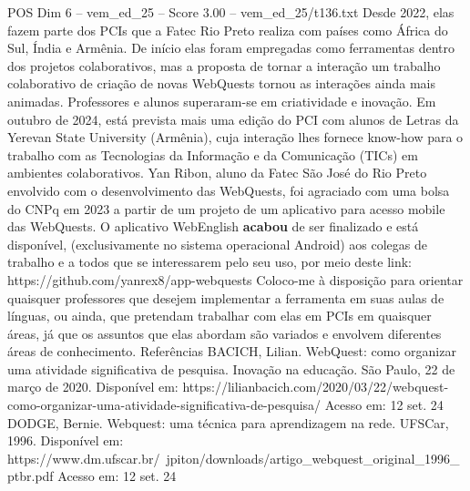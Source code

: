 \begin{textsample}{POS Dim 6 – vem\_ed\_25 – Score 3.00 – vem\_ed\_25/t136.txt}
Desde 2022, elas fazem parte dos PCIs que a Fatec Rio Preto realiza com países como África do Sul, Índia e Armênia.
De início elas foram empregadas como ferramentas dentro dos projetos colaborativos, mas a proposta de tornar a interação um trabalho colaborativo de criação de novas WebQuests tornou as interações ainda mais animadas.
Professores e alunos superaram-se em criatividade e inovação.
Em outubro de 2024, está prevista mais uma edição do PCI com alunos de Letras da Yerevan State University (Armênia), cuja interação lhes fornece know-how para o trabalho com as Tecnologias da Informação e da Comunicação (TICs) em ambientes colaborativos.
Yan Ribon, aluno da Fatec São José do Rio Preto envolvido com o desenvolvimento das WebQuests, foi agraciado com uma bolsa do CNPq em 2023 a partir de um projeto de um aplicativo para acesso mobile das WebQuests.
O aplicativo WebEnglish \textbf{acabou} de ser finalizado e está disponível, (exclusivamente no sistema operacional Android) aos colegas de trabalho e a todos que se interessarem pelo seu uso, por meio deste link: https://github.com/yanrex8/app-webquests Coloco-me à disposição para orientar quaisquer professores que desejem implementar a ferramenta em suas aulas de línguas, ou ainda, que pretendam trabalhar com elas em PCIs em quaisquer áreas, já que os assuntos que elas abordam são variados e envolvem diferentes áreas de conhecimento.
Referências BACICH, Lilian.
WebQuest: como organizar uma atividade significativa de pesquisa.
Inovação na educação.
São Paulo, 22 de março de 2020.
Disponível em: https://lilianbacich.com/2020/03/22/webquest-como-organizar-uma-atividade-significativa-de-pesquisa/ Acesso em: 12 set. 24 DODGE, Bernie.
Webquest: uma técnica para aprendizagem na rede.
UFSCar, 1996.
Disponível em: https://www.dm.ufscar.br/~jpiton/downloads/artigo\_webquest\_original\_1996\_ptbr.pdf Acesso em: 12 set. 24

\end{textsample}
